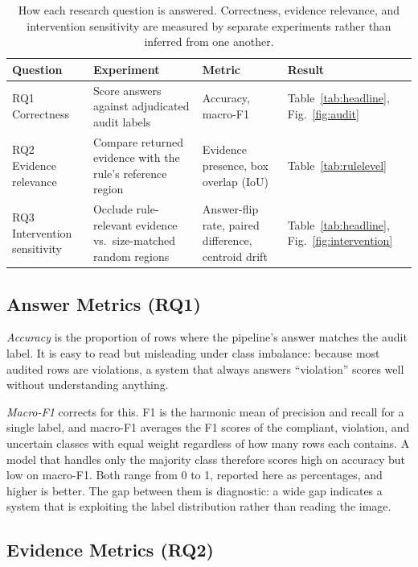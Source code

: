 \documentclass[conference]{IEEEtran}
\begin{document}
\begin{table}[tb]
\centering
\caption{How each research question is answered. Correctness, evidence relevance, and intervention sensitivity are measured by separate experiments rather than inferred from one another.}
\label{tab:rqmap}
{\footnotesize
\begin{tabular}{L{0.62in}L{1.15in}L{1.05in}L{0.52in}}
\toprule
Question & Experiment & Metric & Result \\
\midrule
RQ1 Correctness & Score answers against adjudicated audit labels & Accuracy, macro-F1 & Table~\ref{tab:headline}, Fig.~\ref{fig:audit} \\
\addlinespace
RQ2 Evidence relevance & Compare returned evidence with the rule's reference region & Evidence presence, box overlap (IoU) & Table~\ref{tab:rulelevel} \\
\addlinespace
RQ3 Intervention sensitivity & Occlude rule-relevant evidence vs.\ size-matched random regions & Answer-flip rate, paired difference, centroid drift & Table~\ref{tab:headline}, Fig.~\ref{fig:intervention} \\
\bottomrule
\end{tabular}
\par}
\end{table}

\subsection{Answer Metrics (RQ1)}

\textit{Accuracy} is the proportion of rows where the pipeline's answer matches the audit label. It is easy to read but misleading under class imbalance: because most audited rows are violations, a system that always answers ``violation'' scores well without understanding anything.

\textit{Macro-F1} corrects for this. F1 is the harmonic mean of precision and recall for a single label, and macro-F1 averages the F1 scores of the compliant, violation, and uncertain classes with equal weight regardless of how many rows each contains. A model that handles only the majority class therefore scores high on accuracy but low on macro-F1. Both range from 0 to 1, reported here as percentages, and higher is better. The gap between them is diagnostic: a wide gap indicates a system that is exploiting the label distribution rather than reading the image.

\subsection{Evidence Metrics (RQ2)}
\end{document}
